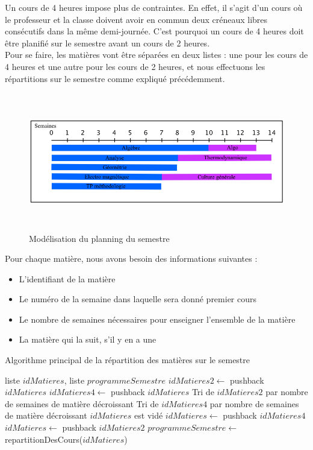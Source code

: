 Un cours de 4 heures impose plus de contraintes. En effet, il s'agit d'un cours où le professeur et la classe doivent avoir en commun deux créneaux libres consécutifs dans la même demi-journée. C'est pourquoi un cours de 4 heures doit être planifié sur le semestre avant un cours de 2 heures.\\

Pour se faire, les matières vont être séparées en deux listes : une pour les cours de 4 heures et une autre pour les cours de 2 heures, et nous effectuons les répartitions sur le semestre comme expliqué précédemment.\\

\begin{figure}[! ht ]
    \centering
    \begin{minipage}[t]{14 cm}
        \centering
            \includegraphics [width=160mm, height=60mm]{RepartitionSemestre.png}
        \caption {Modélisation du planning du semestre}
    \end{minipage}
\end{figure}


Pour chaque matière, nous avons besoin des informations suivantes :
\begin{itemize}
\item L'identifiant de la matière
\item Le numéro de la semaine dans laquelle sera donné premier cours
\item Le nombre de semaines nécessaires pour enseigner l'ensemble de la matière
\item La matière qui la suit, s'il y en a une
\end{itemize}

\begin{algorithm}
\caption{Algorithme principal de la répartition des matières sur le semestre}
\begin{algorithmic}
\REQUIRE liste $idMatieres$, liste $programmeSemestre$
\STATE $idMatieres2 \leftarrow$ pushback $idMatieres$
\ELSE
\STATE $idMatieres4 \leftarrow$ pushback $idMatieres$
\ENDIF
\ENDFOR
\STATE Tri de $idMatieres2$ par nombre de semaines de matière décroissant
\STATE Tri de $idMatieres4$ par nombre de semaines de matière décroissant
\STATE $idMatieres$ est vidé
\STATE $idMatieres \leftarrow$ pushback $idMatieres4$
\ENDFOR
{}
\STATE $idMatieres \leftarrow$ pushback $idMatieres2$
\ENDFOR
\RETURN $programmeSemestre \leftarrow$ repartitionDesCours($idMatieres$)
\end{algorithmic}
\end{algorithm}

